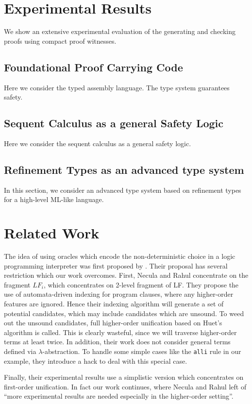 \documentclass{acmconf}
\begin{document}
\section{Experimental Results}

We show an extensive experimental evaluation of the generating and
checking proofs using compact proof witnesses.

\subsection{Foundational Proof Carrying Code}
Here we consider the typed assembly language. The type system
guarantees safety.

\subsection{Sequent Calculus as a general Safety Logic}
Here we consider the sequent calculus as a general safety logic.

\subsection{Refinement Types as an advanced type system}
In this section, we consider an advanced type system based on
refinement types for a high-level ML-like language. 


\section{Related Work}
The idea of using oracles which encode the non-deterministic choice in
a logic programming interpreter was first proposed by
\cite{necula+:oracles}. Their proposal has several restriction which
our work overcomes. First, Necula and Rahul concentrate on the
fragment $LF_i$, which concentrates on 2-level fragment of
LF. They propose the use of automata-driven indexing for program
clauses, where any higher-order features are ignored. Hence their
indexing algorithm will generate a set of potential candidates, which
may include candidates which are unsound. To weed out the unsound
candidates, full higher-order unification based on Huet's algorithm is
called. This is clearly wasteful, since we will traverse higher-order
terms at least twice. In addition, their work does not consider
general terms defined via $\lambda$-abstraction. To handle some simple
cases like the {\tt alli} rule in our example, they introduce a hack
to deal with this special case.

Finally, their experimental results use a simplistic version which
concentrates on first-order unification.  In fact our work continues,
where Necula and Rahul left of ``more experimental results are needed
especially in the higher-order setting''.
\end{document}
